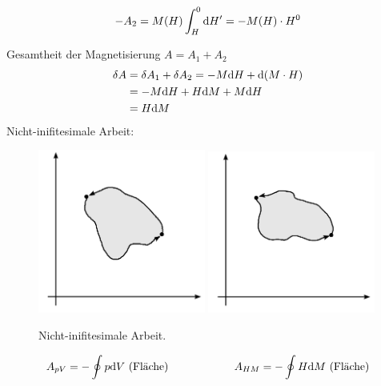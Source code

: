 \begin{enumerate}[a)]
\begin{enumerate}[i)]
\begin{equation}
            - A_2 = M(H) \int_{H}^{0} \mathrm{d} H' = - M(H) \cdot H^0
        \end{equation}
    \end{enumerate}
    Gesamtheit der Magnetisierung $A = A_1 + A_2$
    \begin{equation}
        \begin{split}
            \delta A &= \delta A_1 + \delta A_2 = - M \mathrm{d} H + \mathrm{d}(M \cdot H) \\
            &= - M \mathrm{d} H + H \mathrm{d} M + M \mathrm{d} H \\
            &= H \mathrm{d} M
        \end{split}
    \end{equation}
    Nicht-inifitesimale Arbeit:
    \begin{figure}[H]
        \begin{center}
            \includegraphics[width=0.49\textwidth]{../img/notInfWork_p-V.pdf}
            \includegraphics[width=0.49\textwidth]{../img/notInfWork_H-M.pdf}
            \caption{Nicht-inifitesimale Arbeit.}  %
            \label{img:label}
        \end{center}
    \end{figure}
    \begin{equation}
        A_{pV} = - \oint p \difd V \text{  (Fläche)} \qquad \qquad \qquad A_{HM} = - \oint H \difd M \text{  (Fläche)}

\end{equation}
\end{enumerate}

